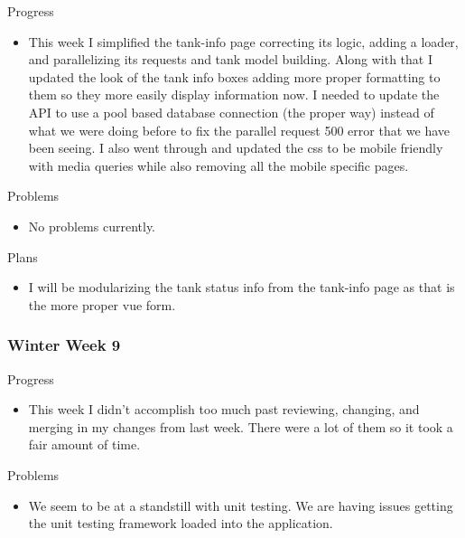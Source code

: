         \noindent
        Progress
        \begin{itemize}
            \item This week I simplified the tank-info page correcting its logic, adding a loader, and parallelizing its requests and tank model building.  Along with that I updated the look of the tank info boxes adding more proper formatting to them so they more easily display information now.  I needed to update the API to use a pool based database connection (the proper way) instead of what we were doing before to fix the parallel request 500 error that we have been seeing.  I also went through and updated the css to be mobile friendly with media queries while also removing all the mobile specific pages.
        \end{itemize}
        
        \noindent
        Problems
        \begin{itemize}
            \item No problems currently.
        \end{itemize}
        
        \noindent
        Plans
        \begin{itemize}
            \item I will be modularizing the tank status info from the tank-info page as that is the more proper vue form.
        \end{itemize}
        
    \subsubsection{Winter Week 9}
    
        \noindent
        Progress
        \begin{itemize}
            \item This week I didn’t accomplish too much past reviewing, changing, and merging in my changes from last week.  There were a lot of them so it took a fair amount of time.
        \end{itemize}
        
        \noindent
        Problems
        \begin{itemize}
            \item We seem to be at a standstill with unit testing.  We are having issues getting the unit testing framework loaded into the application.
        \end{itemize}
        
